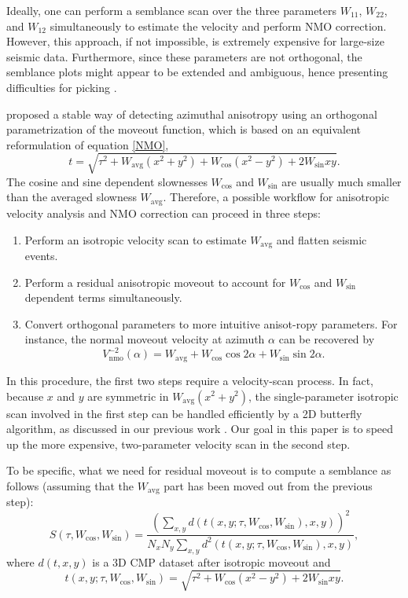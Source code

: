 Ideally, one can perform a semblance scan \citep{TK69} over the three parameters $W_{11}$, $W_{22}$, and $W_{12}$ simultaneously to estimate the velocity and perform NMO correction. However, this approach, if not impossible, is extremely expensive for large-size seismic data. Furthermore, since these parameters are not orthogonal, the semblance plots might appear to be extended and ambiguous, hence presenting difficulties for picking \citep{FJH06}. 

\cite{DSSHOZ11} proposed a stable way of detecting azimuthal anisotropy using an orthogonal parametrization of the moveout function, which is based on an equivalent reformulation of equation \ref{NMO},
\begin{equation} \label{NMO1}
t=\sqrt{\tau^2+W_{\text{avg}}(x^2+y^2)+W_{\cos}(x^2-y^2)+2W_{\sin}xy}.
\end{equation}
The cosine and sine dependent slownesses $W_{\cos}$ and $W_{\sin}$ are usually much smaller than the averaged slowness $W_{\text{avg}}$. Therefore, a possible workflow for anisotropic velocity analysis and NMO correction can proceed in three steps: 
\begin{enumerate}
\item Perform an isotropic velocity scan to estimate $W_{\text{avg}}$ and flatten seismic events. 
\item Perform a residual anisotropic moveout to account for $W_{\cos}$ and $W_{\sin}$ dependent terms simultaneously.
\item Convert orthogonal parameters to more intuitive anisot-ropy parameters. For instance, the normal moveout velocity at azimuth $\alpha$ can be recovered by 
\begin{equation}
V_{\text{nmo}}^{-2}(\alpha)=W_{\text{avg}}+W_{\cos}\cos 2 \alpha + W_{\sin}\sin 2 \alpha.
\end{equation}
\end{enumerate}
In this procedure, the first two steps require a velocity-scan process. In fact, because $x$ and $y$ are symmetric in $W_{\text{avg}}(x^2+y^2)$, the single-parameter isotropic scan involved in the first step can be handled efficiently by a 2D butterfly algorithm, as discussed in our previous work \citep{HFDY12, HFDY13}. Our goal in this paper is to speed up the more expensive, two-parameter velocity scan in the second step.

To be specific, what we need for residual moveout is to compute a semblance as follows (assuming that the $W_{\text{avg}}$ part has been moved out from the previous step):
\begin{equation} \label{semb}
S(\tau,W_{\cos},W_{\sin})=\frac{\left(\displaystyle\sum_{x,y}d(t(x,y;\tau,W_{\cos},W_{\sin}),x,y)\right)^2}{N_xN_y\displaystyle\sum_{x,y}d^2(t(x,y;\tau,W_{\cos},W_{\sin}),x,y)},
\end{equation}
where $d(t,x,y)$ is a 3D CMP dataset after isotropic moveout and
\begin{equation}
t(x,y;\tau,W_{\cos},W_{\sin})=\sqrt{\tau^2+W_{\cos}(x^2-y^2)+2W_{\sin}xy}.
\end{equation}

